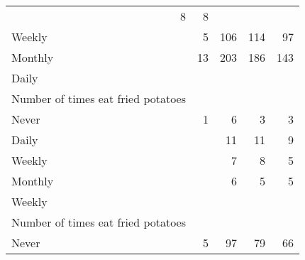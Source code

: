 \documentclass{article}
\begin{document}
\begin{tabular}{lllll}
  \multicolumn{1}{r}{8} &
  \multicolumn{1}{r}{8} \\
\multicolumn{1}{l}{\hspace{5em}Weekly} &
  \multicolumn{1}{|r}{5} &
  \multicolumn{1}{r}{106} &
  \multicolumn{1}{r}{114} &
  \multicolumn{1}{r}{97} \\
\multicolumn{1}{l}{\hspace{5em}Monthly} &
  \multicolumn{1}{|r}{13} &
  \multicolumn{1}{r}{203} &
  \multicolumn{1}{r}{186} &
  \multicolumn{1}{r}{143} \\
\multicolumn{1}{l}{\hspace{3em}Daily} &
  \multicolumn{1}{|r}{} &
  \multicolumn{1}{r}{} &
  \multicolumn{1}{r}{} &
  \multicolumn{1}{r}{} \\
\multicolumn{1}{l}{\hspace{4em}Number of times eat fried potatoes} &
  \multicolumn{1}{|r}{} &
  \multicolumn{1}{r}{} &
  \multicolumn{1}{r}{} &
  \multicolumn{1}{r}{} \\
\multicolumn{1}{l}{\hspace{5em}Never} &
  \multicolumn{1}{|r}{1} &
  \multicolumn{1}{r}{6} &
  \multicolumn{1}{r}{3} &
  \multicolumn{1}{r}{3} \\
\multicolumn{1}{l}{\hspace{5em}Daily} &
  \multicolumn{1}{|r}{} &
  \multicolumn{1}{r}{11} &
  \multicolumn{1}{r}{11} &
  \multicolumn{1}{r}{9} \\
\multicolumn{1}{l}{\hspace{5em}Weekly} &
  \multicolumn{1}{|r}{} &
  \multicolumn{1}{r}{7} &
  \multicolumn{1}{r}{8} &
  \multicolumn{1}{r}{5} \\
\multicolumn{1}{l}{\hspace{5em}Monthly} &
  \multicolumn{1}{|r}{} &
  \multicolumn{1}{r}{6} &
  \multicolumn{1}{r}{5} &
  \multicolumn{1}{r}{5} \\
\multicolumn{1}{l}{\hspace{3em}Weekly} &
  \multicolumn{1}{|r}{} &
  \multicolumn{1}{r}{} &
  \multicolumn{1}{r}{} &
  \multicolumn{1}{r}{} \\
\multicolumn{1}{l}{\hspace{4em}Number of times eat fried potatoes} &
  \multicolumn{1}{|r}{} &
  \multicolumn{1}{r}{} &
  \multicolumn{1}{r}{} &
  \multicolumn{1}{r}{} \\
\multicolumn{1}{l}{\hspace{5em}Never} &
  \multicolumn{1}{|r}{5} &
  \multicolumn{1}{r}{97} &
  \multicolumn{1}{r}{79} &
  \multicolumn{1}{r}{66} \\

\end{tabular}
\end{document}
